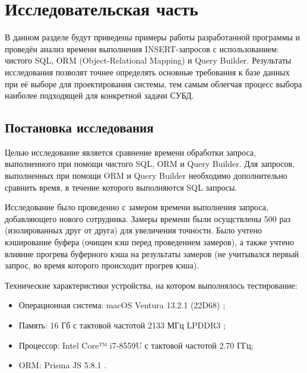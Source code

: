 \section{\large Исследовательская часть}
\label{cha:research}

В данном разделе будут приведены примеры работы разработанной программы и проведён анализ времени выполнения  INSERT-запросов с использованием: чистого SQL, ORM (Object-Relational Mapping) и Query Builder. Результаты исследования позволят точнее определять основные требования к базе данных при её выборе для проектирования системы, тем самым облегчая процесс выбора наиболее подходящей для конкретной задачи СУБД.	


\subsection{Постановка исследования}

Целью исследование является сравнение времени обработки запроса, выполненного при помощи чистого SQL, ORM и Query Builder. Для запросов, выполненных при помощи ORM и Query Builder необходимо дополнительно сравнить время, в течение которого выполняются SQL запросы.

Исследование было проведенно с замером времени выполнения запроса, добавляющего нового сотрудника. Замеры времени были осущствлены 500 раз (изолированных друг от друга) для увеличения точности. Было учтено кэширование буфера (очищен кэш перед проведением замеров), а также учтено влияние прогрева буферного кэша на результаты замеров (не учитывался первый запрос, во время которого происходит прогрев кэша).

Технические характеристики устройства, на котором выполнялось тестирование:

\begin{itemize}[label=---]
	\item Операционная система: macOS Ventura 13.2.1 (22D68) \cite{macos};
	\item Память: 16 Гб с тактовой частотой 2133 МГц LPDDR3 \cite{memory};
	\item Процессор: Intel Core™ i7-8559U \cite{intel} с тактовой частотой  2.70 ГГц;
	\item ORM: Prisma JS 5.8.1 \cite{prisma}.
\end{itemize}

